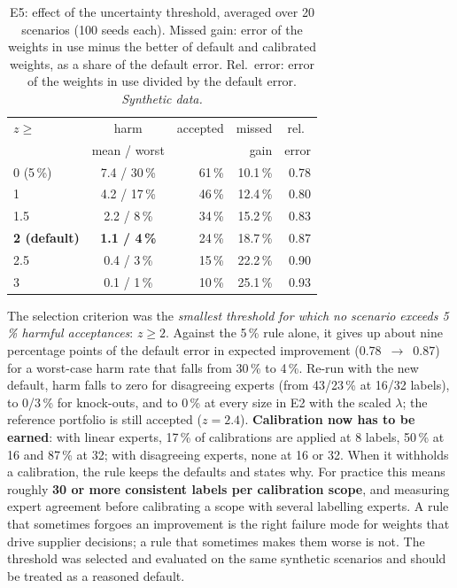 \documentclass[10pt,twocolumn,a4paper]{article}
\newcommand{\synth}{\textit{Synthetic data.}}
\begin{document}
\begin{table}[t]
  \caption{E5: effect of the uncertainty threshold, averaged over 20 scenarios (100 seeds
  each). Missed gain: error of the weights in use minus the better of default and
  calibrated weights, as a share of the default error. Rel.\ error: error of the weights in
  use divided by the default error. \synth}
  \label{tab:e5}
  \small
  \setlength{\tabcolsep}{2.8pt}
  \begin{tabular}{@{}lcrrr@{}}
    \toprule
    $z\geq$ & harm & accepted & missed & rel.\ \\
     & mean / worst & & gain & error \\
    \midrule
    0 (5\,\%) & 7.4 / 30\,\% & 61\,\% & 10.1\,\% & 0.78 \\
    1 & 4.2 / 17\,\% & 46\,\% & 12.4\,\% & 0.80 \\
    1.5 & 2.2 / 8\,\% & 34\,\% & 15.2\,\% & 0.83 \\
    \textbf{2 (default)} & \textbf{1.1 / 4\,\%} & 24\,\% & 18.7\,\% & 0.87 \\
    2.5 & 0.4 / 3\,\% & 15\,\% & 22.2\,\% & 0.90 \\
    3 & 0.1 / 1\,\% & 10\,\% & 25.1\,\% & 0.93 \\
    \bottomrule
  \end{tabular}
\end{table}

The selection criterion was the \emph{smallest threshold for which no scenario exceeds
5\,\% harmful acceptances}: $z\geq2$. Against the 5\,\% rule alone, it gives up about nine
percentage points of the default error in expected improvement (0.78~$\rightarrow$~0.87)
for a worst-case harm rate that falls from 30\,\% to 4\,\%. Re-run with the new default,
harm falls to zero for disagreeing experts (from 43/23\,\% at 16/32 labels), to 0/3\,\% for
knock-outs, and to 0\,\% at every size in E2 with the scaled $\lambda$; the reference
portfolio is still accepted ($z=2.4$). \textbf{Calibration now has to be earned}: with
linear experts, 17\,\% of calibrations are applied at 8 labels, 50\,\% at 16 and 87\,\% at
32; with disagreeing experts, none at 16 or 32. When it withholds a calibration, the rule
keeps the defaults and states why. For practice this means roughly \textbf{30 or more
consistent labels per calibration scope}, and measuring expert agreement before calibrating
a scope with several labelling experts. A rule that sometimes forgoes an improvement is
the right failure mode for weights that drive supplier decisions; a rule that sometimes
makes them worse is not. The threshold was selected and evaluated on the same synthetic
scenarios and should be treated as a reasoned default.
\end{document}
